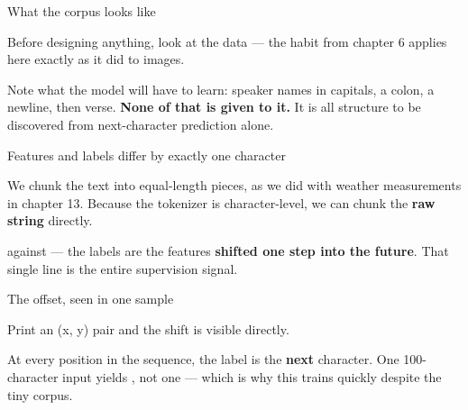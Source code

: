 \documentclass[aspectratio=169,11pt,t]{beamer}
\begin{document}
\begin{frame}[shrink=25]{What the corpus looks like}
{\fontsize{9.4}{12.6}\selectfont\color{fg2}Before designing anything, look at the data --- the habit from chapter 6 applies here exactly as it did to images.\par}\vskip 4pt
{\fontsize{9.4}{12.6}\selectfont\color{fg2}Note what the model will have to learn: speaker names in capitals, a colon, a newline, then verse. \textbf{None of that is given to it.} It is all structure to be discovered from next-character prediction alone.\par}\vskip 4pt
\end{frame}

\begin{frame}[shrink=25]{Features and labels differ by exactly one character}
{\fontsize{9.4}{12.6}\selectfont\color{fg2}We chunk the text into equal-length pieces, as we did with weather measurements in chapter 13. Because the tokenizer is character-level, we can chunk the \textbf{raw string} directly.\par}\vskip 4pt
\begin{iband}[signal]
 against  --- the labels are the features \textbf{shifted one step into the future}. That single line is the entire supervision signal.
\end{iband}
\end{frame}

\begin{frame}[shrink=25]{The offset, seen in one sample}
{\fontsize{9.4}{12.6}\selectfont\color{fg2}Print an (x, y) pair and the shift is visible directly.\par}\vskip 4pt
{\fontsize{9.4}{12.6}\selectfont\color{fg2}At every position in the sequence, the label is the \textbf{next} character. One 100-character input yields , not one --- which is why this trains quickly despite the tiny corpus.\par}\vskip 4pt
\end{frame}
\end{document}

